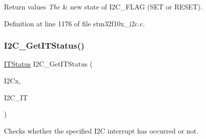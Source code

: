 \begin{DoxyRetVals}{Return values}
{\em The} & new state of I2\+C\+\_\+\+F\+L\+AG (S\+ET or R\+E\+S\+ET). \\
\hline
\end{DoxyRetVals}


Definition at line 1176 of file stm32f10x\+\_\+i2c.\+c.

\mbox{\label{group___i2_c___private___functions_ga447771fbbd94a56f3570b9f430a069ba}} 
\subsubsection{\texorpdfstring{I2\+C\+\_\+\+Get\+I\+T\+Status()}{I2C\_GetITStatus()}}
{\footnotesize\ttfamily \hyperlink{group___exported__types_gaacbd7ed539db0aacd973a0f6eca34074}{I\+T\+Status} I2\+C\+\_\+\+Get\+I\+T\+Status (\begin{DoxyParamCaption}\item[{\hyperlink{struct_i2_c___type_def}{I2\+C\+\_\+\+Type\+Def} $\ast$}]{I2\+Cx,  }\item[{uint32\+\_\+t}]{I2\+C\+\_\+\+IT }\end{DoxyParamCaption})}



Checks whether the specified I2C interrupt has occurred or not. 


